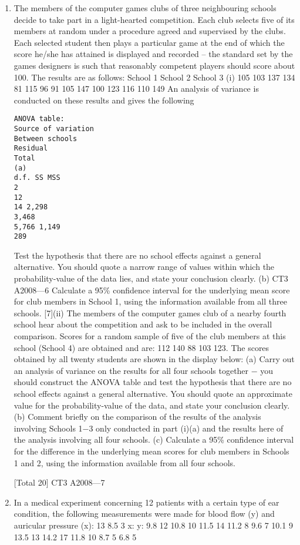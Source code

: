 \documentclass[a4paper,12pt]{article}
\begin{document}
\begin{enumerate}
\item The members of the computer games clubs of three neighbouring schools decide to take part in a light-hearted competition. Each club selects five of its members at random under a procedure agreed and supervised by the clubs. Each selected student
then plays a particular game at the end of which the score he/she has attained is displayed and recorded – the standard set by the games designers is such that reasonably competent players should score about 100.
The results are as follows:
School 1
School 2
School 3
(i)
105
103
137
134
81
115
96
91
105
147
100
123
116
110
149
An analysis of variance is conducted on these results and gives the following
\begin{verbatim}
ANOVA table:
Source of variation
Between schools
Residual
Total
(a)
d.f. SS MSS
2
12
14 2,298
3,468
5,766 1,149
289
\end{verbatim}
Test the hypothesis that there are no school effects against a general alternative.
You should quote a narrow range of values within which the probability-value of the data lies, and state your conclusion clearly.
(b)
CT3 A2008—6
Calculate a 95\% confidence interval for the underlying mean score for club members in School 1, using the information available from all
three schools.
[7](ii)
The members of the computer games club of a nearby fourth school hear about
the competition and ask to be included in the overall comparison. Scores for a random sample of five of the club members at this school (School 4) are
obtained and are:
112 140 88 103 123.
The scores obtained by all twenty students are shown in the display below:
(a)
Carry out an analysis of variance on the results for all four schools together − you should construct the ANOVA table and test the
hypothesis that there are no school effects against a general alternative.
You should quote an approximate value for the probability-value of the data, and state your conclusion clearly.
(b) Comment briefly on the comparison of the results of the analysis
involving Schools 1−3 only conducted in part (i)(a) and the results here of the analysis involving all four schools.
(c) Calculate a 95\% confidence interval for the difference in the underlying mean scores for club members in Schools 1 and 2, using the
information available from all four schools.

[Total 20]
CT3 A2008—7
\item In a medical experiment concerning 12 patients with a certain type of ear condition,
the following measurements were made for blood flow (y) and auricular pressure (x):
13
8.5
3
x:
y:
9.8
12
10.8
10
11.5
14
11.2
8
9.6
7
10.1
9
13.5
13
14.2
17
11.8
10
8.7
5
6.8
5


\end{enumerate}
\end{document}
